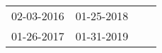 \begin{supertabular}{llll}
 02-03-2016 &  01-25-2018 \\
 01-26-2017 &  01-31-2019 \\
\end{supertabular}
